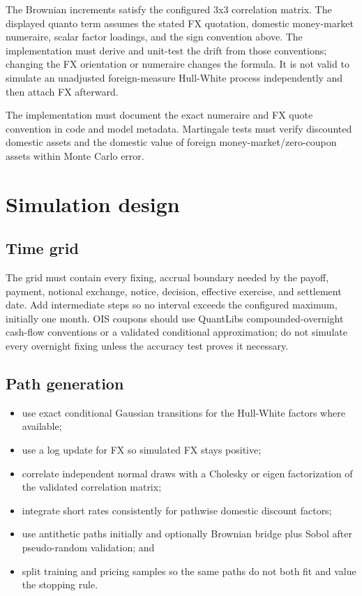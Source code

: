 \documentclass[conference]{IEEEtran}
\providecommand{\tightlist}{}
\begin{document}
The Brownian increments satisfy the configured 3x3 correlation matrix.
The displayed quanto term assumes the stated FX quotation, domestic
money-market numeraire, scalar factor loadings, and the sign convention
above. The implementation must derive and unit-test the drift from those
conventions; changing the FX orientation or numeraire changes the
formula. It is not valid to simulate an unadjusted foreign-measure
Hull-White process independently and then attach FX afterward.

The implementation must document the exact numeraire and FX quote
convention in code and model metadata. Martingale tests must verify
discounted domestic assets and the domestic value of foreign
money-market/zero-coupon assets within Monte Carlo error.

\section{Simulation design}\label{7-simulation-design}

\subsection{Time grid}\label{71-time-grid}

The grid must contain every fixing, accrual boundary needed by the
payoff, payment, notional exchange, notice, decision, effective
exercise, and settlement date. Add intermediate steps so no interval
exceeds the configured maximum, initially one month. OIS coupons should
use QuantLib\textquotesingle s compounded-overnight cash-flow
conventions or a validated conditional approximation; do not simulate
every overnight fixing unless the accuracy test proves it necessary.

\subsection{Path generation}\label{72-path-generation}

\begin{itemize}
\tightlist
\item
  use exact conditional Gaussian transitions for the Hull-White factors
  where available;
\item
  use a log update for FX so simulated FX stays positive;
\item
  correlate independent normal draws with a Cholesky or eigen
  factorization of the validated correlation matrix;
\item
  integrate short rates consistently for pathwise domestic discount
  factors;
\item
  use antithetic paths initially and optionally Brownian bridge plus
  Sobol after pseudo-random validation; and
\item
  split training and pricing samples so the same paths do not both fit
  and value the stopping rule.
\end{itemize}
\end{document}

